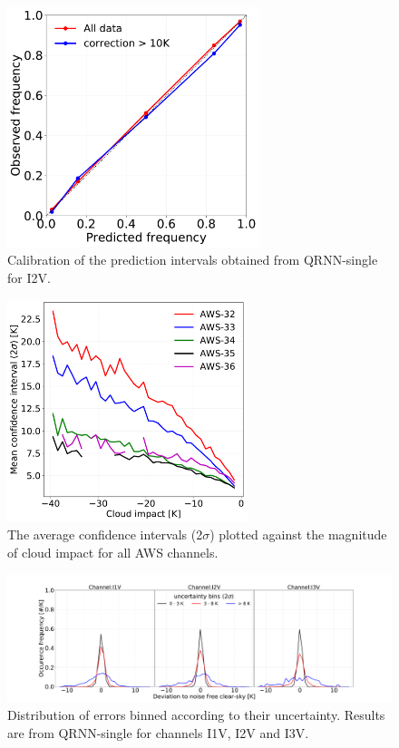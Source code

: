 \documentclass[amt, manuscript]{copernicus}
\begin{document}
\begin{figure}[t]
	\includegraphics[height = 70mm]{Figures/calibration_QRNN_I2V.pdf}	
	\caption{Calibration of the prediction intervals obtained from QRNN-single for I2V. }
	\label{fig:calibration_I1V}	
\end{figure}
\begin{figure}[t]
	\includegraphics[width = 70mm]{Figures/cloud_impact_uncertainty_AWS.pdf}	
	\caption{The average confidence intervals (2$\sigma$) plotted against the magnitude of cloud impact for all AWS channels.}
	\label{fig:uncertainty_cloud_impact}	
\end{figure}
\begin{figure}[t]
	\includegraphics[width=\textwidth]{Figures/PDF_uncertainty_bins_QRNN-single.pdf}	
	\caption{Distribution of errors binned according to their uncertainty. Results are from QRNN-single for channels I1V, I2V and I3V.}
	\label{fig:error_distribution_uncertainty_bins}	
\end{figure}
\end{document}
